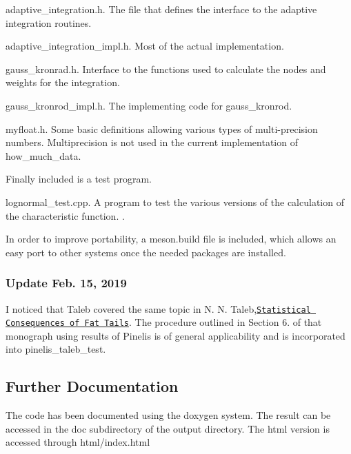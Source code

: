 \begin{DoxyItemize}
\item adaptive\+\_\+integration.\+h. The file that defines the interface to the adaptive integration routines.
\item adaptive\+\_\+integration\+\_\+impl.\+h. Most of the actual implementation.
\item gauss\+\_\+kronrad.\+h. Interface to the functions used to calculate the nodes and weights for the integration.
\item gauss\+\_\+kronrod\+\_\+impl.\+h. The implementing code for gauss\+\_\+kronrod.
\item myfloat.\+h. Some basic definitions allowing various types of multi-\/precision numbers. Multiprecision is not used in the current implementation of how\+\_\+much\+\_\+data.
\end{DoxyItemize}

Finally included is a test program.


\begin{DoxyItemize}
\item lognormal\+\_\+test.\+cpp. A program to test the various versions of the calculation of the characteristic function. .
\end{DoxyItemize}

In order to improve portability, a meson.\+build file is included, which allows an easy port to other systems once the needed packages are installed.

\subsubsection*{Update Feb. 15, 2019}

I noticed that Taleb covered the same topic in N. N. Taleb,\href{https://www.academia.edu/37221402/THE_STATISTICAL_CONSEQUENCES_OF_FAT_TAILS_TECHNICAL_INCERTO_COLLECTION_?auto=download}{\tt Statistical Consequences of Fat Tails}. The procedure outlined in Section 6. of that monograph using results of Pinelis is of general applicability and is incorporated into pinelis\+\_\+taleb\+\_\+test.

\subsection*{Further Documentation}

The code has been documented using the doxygen system. The result can be accessed in the doc subdirectory of the output directory. The html version is accessed through html/index.\+html

